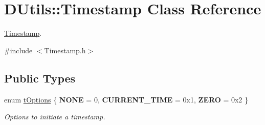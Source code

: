 \hypertarget{classDUtils_1_1Timestamp}{}\section{D\+Utils\+:\+:Timestamp Class Reference}
\label{classDUtils_1_1Timestamp}


\hyperlink{classDUtils_1_1Timestamp}{Timestamp}.  




{\ttfamily \#include $<$Timestamp.\+h$>$}

\subsection*{Public Types}
\begin{DoxyCompactItemize}
\item 
\mbox{\label{classDUtils_1_1Timestamp_a5a8a3cb7f9e0f73bf11fce42688b06c8}} 
enum \hyperlink{classDUtils_1_1Timestamp_a5a8a3cb7f9e0f73bf11fce42688b06c8}{t\+Options} \{ {\bfseries N\+O\+NE} = 0, 
{\bfseries C\+U\+R\+R\+E\+N\+T\+\_\+\+T\+I\+ME} = 0x1, 
{\bfseries Z\+E\+RO} = 0x2
 \}\begin{DoxyCompactList}\small\item\em Options to initiate a timestamp. \end{DoxyCompactList}
\end{DoxyCompactItemize}
